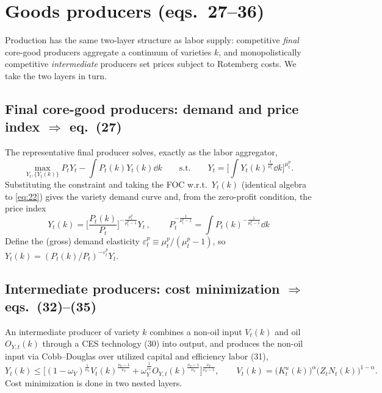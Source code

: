 \section{Goods producers (eqs.\ 27--36)}\label{sec:firms}

Production has the same two-layer structure as labor supply: competitive \emph{final} core-good
producers aggregate a continuum of varieties $k$, and monopolistically competitive \emph{intermediate}
producers set prices subject to Rotemberg costs. We take the two layers in turn.

\subsection{Final core-good producers: demand and price index \texorpdfstring{$\Rightarrow$}{=>} eq.\ (27)}
The representative final producer solves, exactly as the labor aggregator,
\[
\max_{Y_t,\{Y_t(k)\}} P_tY_t-\int P_t(k)Y_t(k)\dd k
\qquad\text{s.t.}\qquad
Y_t=\Big[\int Y_t(k)^{\frac{1}{\mu^p_t}}\dd k\Big]^{\mu^p_t}.
\]
Substituting the constraint and taking the FOC w.r.t.\ $Y_t(k)$ (identical algebra to
\eqref{eq:22}) gives the variety demand curve and, from the zero-profit condition, the price index
\begin{equation}\label{eq:27}
\boxed{\,Y_t(k)=\Big[\frac{P_t(k)}{P_t}\Big]^{-\frac{\mu^p_t}{\mu^p_t-1}}Y_t\,},
\qquad
\boxed{\,P_t^{-\frac{1}{\mu^p_t-1}}=\int P_t(k)^{-\frac{1}{\mu^p_t-1}}\dd k\,}
\tag{P-27}
\end{equation}
Define the (gross) demand elasticity $\varepsilon^p_t\equiv\mu^p_t/(\mu^p_t-1)$, so
$Y_t(k)=(P_t(k)/P_t)^{-\varepsilon^p_t}Y_t$.

\subsection{Intermediate producers: cost minimization \texorpdfstring{$\Rightarrow$}{=>} eqs.\ (32)--(35)}
An intermediate producer of variety $k$ combines a non-oil input $V_t(k)$ and oil $O_{Y,t}(k)$ through
a CES technology (30) into output, and produces the non-oil input via Cobb--Douglas over utilized
capital and efficiency labor (31),
\begin{equation}\label{eq:prod}
Y_t(k)\le\Big[(1-\omega_Y)^{\frac1{\nu_Y}}V_t(k)^{\frac{\nu_Y-1}{\nu_Y}}
+\omega_Y^{\frac1{\nu_Y}}O_{Y,t}(k)^{\frac{\nu_Y-1}{\nu_Y}}\Big]^{\frac{\nu_Y}{\nu_Y-1}},
\qquad V_t(k)=\big(K^u_t(k)\big)^\alpha\big(Z_tN_t(k)\big)^{1-\alpha}.
\end{equation}
Cost minimization is done in two nested layers.

